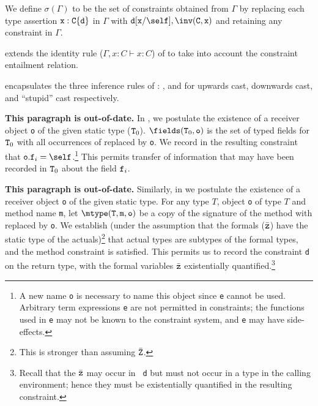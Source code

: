 We define $\sigma(\Gamma)$ to be the set of
constraints obtained from $\Gamma$ by replacing each type assertion
$\TY{\tt C\{d\}}{\tt x}$
in $\Gamma$ with ${\tt d}[{\tt x}/\self],\inv({\tt C},{\tt x})$
and retaining any constraint in $\Gamma$.

\TVar{} extends the identity rule ($\Gamma, x:C \vdash x:C$) of
\FJ{} to take into account the constraint entailment relation.

\TCast{} encapsulates the three inference rules of \FJ{}:
\TUCast{}, \TDCast{} and \TSCast{} for upwards cast, downwards cast, and ``stupid'' cast respectively. 


\textbf{This paragraph is out-of-date.}
In \TField, we postulate the existence of a receiver object {\tt o} of
the given static type (${\tt T}_0$). $\fields({\tt T}_0,{\tt o})$ is
the set of typed fields for ${\tt T}_0$ with all occurrences of 
\this{} replaced  by {\tt o}. We record in the resulting
constraint that ${\tt o.f}_i=\self$.\footnote{A new name {\tt o} is
necessary to name this object since {\tt e} cannot be used. Arbitrary
term expressions {\tt e} are not permitted in constraints; the
functions used in {\tt e} may not be known to the constraint system,
and {\tt e} may have side-effects.}  This permits transfer of
information that may have been recorded in ${\tt T}_0$ about the field
${\tt f}_i$. 

\textbf{This paragraph is out-of-date.}
Similarly, in \TInvk{} we postulate the existence of a receiver object
{\tt o} of the given static type. For any type $T$, object {\tt o} of
type $T$ and method name {\tt m}, let $\mtype({\tt T},{\tt m},{\tt
o})$ be a copy of the signature of the method with \this{} replaced by
{\tt o}. We establish (under the assumption that the formals
($\bar{\tt z}$) have the static type of the actuals)\footnote{This is
stronger than assuming $\bar{\tt Z}$.}  that actual types are subtypes
of the formal types, and the method constraint is satisfied. This
permits us to record the constraint {\tt d} on the return type, with
the formal variables $\bar{\tt z}$ existentially
quantified.\footnote{Recall that the $\bar{\tt z}$ may occur in {\tt
d} but must not occur in a type in the calling environment; hence they
must be existentially quantified in the resulting constraint.}

